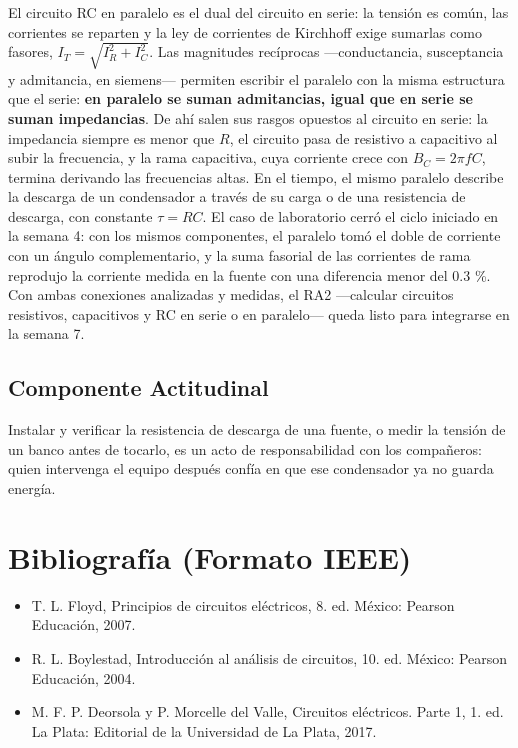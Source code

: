 \documentclass[11pt,letterpaper]{article}
\begin{document}
El circuito RC en paralelo es el dual del circuito en serie: la tensión es común, las corrientes se reparten y la ley de corrientes de Kirchhoff exige sumarlas como fasores, $I_T = \sqrt{I_R^2 + I_C^2}$. Las magnitudes recíprocas ---conductancia, susceptancia y admitancia, en siemens--- permiten escribir el paralelo con la misma estructura que el serie: \textbf{en paralelo se suman admitancias, igual que en serie se suman impedancias}. De ahí salen sus rasgos opuestos al circuito en serie: la impedancia siempre es menor que $R$, el circuito pasa de resistivo a capacitivo al subir la frecuencia, y la rama capacitiva, cuya corriente crece con $B_C = 2\pi f C$, termina derivando las frecuencias altas. En el tiempo, el mismo paralelo describe la descarga de un condensador a través de su carga o de una resistencia de descarga, con constante $\tau = RC$. El caso de laboratorio cerró el ciclo iniciado en la semana 4: con los mismos componentes, el paralelo tomó el doble de corriente con un ángulo complementario, y la suma fasorial de las corrientes de rama reprodujo la corriente medida en la fuente con una diferencia menor del 0.3 \%. Con ambas conexiones analizadas y medidas, el RA2 ---calcular circuitos resistivos, capacitivos y RC en serie o en paralelo--- queda listo para integrarse en la semana 7.

\subsection*{Componente Actitudinal}

\begin{cita}
Instalar y verificar la resistencia de descarga de una fuente, o medir la tensión de un banco antes de tocarlo, es un acto de responsabilidad con los compañeros: quien intervenga el equipo después confía en que ese condensador ya no guarda energía.
\end{cita}

\section{Bibliografía (Formato IEEE)}

{\sloppy
\begin{itemize}[leftmargin=2.6em, labelwidth=2.2em, labelsep=0.4em, align=left]
  \item[{[1]}] T. L. Floyd, Principios de circuitos eléctricos, 8.\textordfeminine{} ed. México: Pearson Educación, 2007.
  \item[{[2]}] R. L. Boylestad, Introducción al análisis de circuitos, 10.\textordfeminine{} ed. México: Pearson Educación, 2004.
  \item[{[3]}] M. F. P. Deorsola y P. Morcelle del Valle, Circuitos eléctricos. Parte 1, 1.\textordfeminine{} ed. La Plata: Editorial de la Universidad de La Plata, 2017.
\end{itemize}
}
\end{document}
